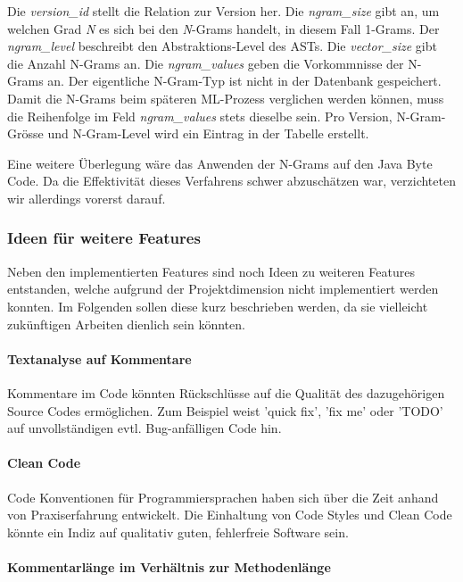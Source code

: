 \documentclass[10pt, a4paper]{article}
\begin{document}
Die \emph{version\_id} stellt die Relation zur Version her. Die \emph{ngram\_size} gibt an, um welchen Grad \emph{N} es sich bei den \emph{N}-Grams handelt, in diesem Fall 1-Grams. Der \emph{ngram\_level} beschreibt den Abstraktions-Level des \acp{AST}. Die \emph{vector\_size} gibt die Anzahl N-Grams an. Die \emph{ngram\_values} geben die Vorkommnisse der N-Grams an. Der eigentliche N-Gram-Typ ist nicht in der Datenbank gespeichert. Damit die N-Grams beim späteren \ac{ML}-Prozess verglichen werden können, muss die Reihenfolge im Feld \emph{ngram\_values} stets dieselbe sein. Pro Version, N-Gram-Grösse und N-Gram-Level wird ein Eintrag in der Tabelle erstellt.

Eine weitere Überlegung wäre das Anwenden der N-Grams auf den Java Byte Code. Da die Effektivität dieses Verfahrens schwer abzuschätzen war, verzichteten wir allerdings vorerst darauf.

\subsubsection{Ideen für weitere Features} \label{sec:morefeatures}

Neben den implementierten Features sind noch Ideen zu weiteren Features entstanden, welche aufgrund der Projektdimension nicht implementiert werden konnten. Im Folgenden sollen diese kurz beschrieben werden, da sie vielleicht zukünftigen Arbeiten dienlich sein könnten.

\paragraph{Textanalyse auf Kommentare}

Kommentare im Code könnten Rück\-schlüs\-se auf die Qualität des dazugehörigen Source Codes ermöglichen. Zum Beispiel weist 'quick fix', 'fix me' oder 'TODO' auf unvollständigen evtl. Bug-an\-fäl\-ligen Code hin.

\paragraph{Clean Code}

Code Konventionen für Programmiersprachen haben sich über die Zeit anhand von Praxiserfahrung entwickelt. Die Einhaltung von Code Styles und Clean Code könnte ein Indiz auf qualitativ guten, fehlerfreie Software sein.

\paragraph{Kommentarlänge im Verhältnis zur Methodenlänge}
\end{document}
